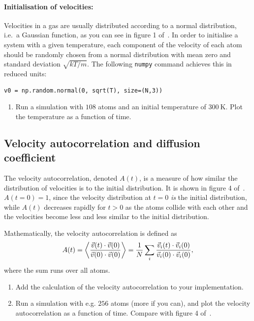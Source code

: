\documentclass[11pt,british,a4paper]{report}
\begin{document}
\paragraph{Initialisation of velocities:} Velocities in a gas are usually distributed according to a normal distribution, i.e.~a Gaussian function, as you can see in figure 1 of~\cite{Rahman_1964}. In order to initialise a system with a given temperature, each component of the velocity of each atom should be randomly chosen from a normal distribution with mean zero and standard deviation \(\sqrt{kT/m}\). The following \texttt{numpy} command achieves this in reduced units:
\begin{lstlisting}
v0 = np.random.normal(0, sqrt(T), size=(N,3))
\end{lstlisting}

\begin{enumerate}[label=\roman*.,resume]
    \item Run a simulation with \(108\) atoms and an initial temperature of \(\SI{300}{\kelvin}\). Plot the temperature as a function of time.
\end{enumerate}

\subsection{Velocity autocorrelation and diffusion coefficient}
The velocity autocorrelation, denoted \(A(t)\), is a measure of how similar the distribution of velocities is to the initial distribution. It is shown in figure 4 of~\cite{Rahman_1964}. \(A(t=0)=1\), since the velocity distribution at \(t=0\) \emph{is} the initial distribution, while \(A(t)\) decreases rapidly for \(t>0\) as the atoms collide with each other and the velocities become less and less similar to the initial distribution.

Mathematically, the velocity autocorrelation is defined as
\begin{equation}
    A(t) = \ev{\frac{\vec{v}(t)\cdot\vec{v}(0)}{\vec{v}(0)\cdot\vec{v}(0)}}
         = \frac{1}{N} \sum_i \frac{\vec{v}_i(t)\cdot\vec{v}_i(0)}{\vec{v}_i(0)\cdot\vec{v}_i(0)},\label{eq:vacf}
\end{equation}
where the sum runs over all atoms.

\begin{enumerate}[label=\roman*.]
    \item Add the calculation of the velocity autocorrelation to your implementation.
    \item Run a simulation with e.g. \(256\) atoms (more if you can), and plot the velocity autocorrelation as a function of time. Compare with figure 4 of~\cite{Rahman_1964}.
\end{enumerate}
\end{document}
